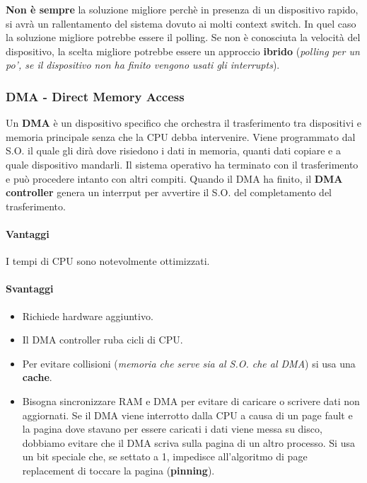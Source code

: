 \documentclass[12pt, letterpaper]{article}
\begin{document}
				\textbf{Non è sempre }la soluzione migliore perchè in presenza di un dispositivo rapido, si avrà un rallentamento del sistema dovuto ai molti context switch. In quel caso la soluzione migliore potrebbe essere il polling. Se non è conosciuta la velocità del dispositivo, la scelta migliore potrebbe essere un approccio \textbf{ibrido} (\textit{polling per un po', se il dispositivo non ha finito vengono usati gli interrupts}). 
				
			\subsubsection{DMA - Direct Memory Access}
				Un \textbf{DMA} è un dispositivo specifico che orchestra il trasferimento tra dispositivi e memoria principale senza che la CPU debba intervenire. Viene programmato dal S.O. il quale gli dirà dove risiedono i dati in memoria, quanti dati copiare e a quale dispositivo mandarli. Il sistema operativo ha terminato con il trasferimento e può procedere intanto con altri compiti. Quando il DMA ha  finito, il \textbf{DMA controller} genera un interrput per avvertire il S.O. del completamento del trasferimento.
				\paragraph{Vantaggi} I tempi di CPU sono notevolmente ottimizzati.
				\paragraph{Svantaggi}
				\begin{itemize}
					\item Richiede hardware aggiuntivo.
					\item Il DMA controller ruba cicli di CPU.
					\item Per evitare collisioni (\textit{memoria che serve sia al S.O. che al DMA}) si usa una \textbf{cache}.
					\item Bisogna sincronizzare RAM e DMA per evitare di caricare o scrivere dati non aggiornati. Se il DMA viene interrotto dalla CPU a causa di un page fault e la pagina dove stavano per essere caricati i dati viene messa su disco, dobbiamo evitare che il DMA scriva sulla pagina di un altro processo. Si usa un bit speciale che, se settato a 1, impedisce all'algoritmo di page replacement di toccare la pagina (\textbf{pinning}).
				\end{itemize}
				
\end{document}

